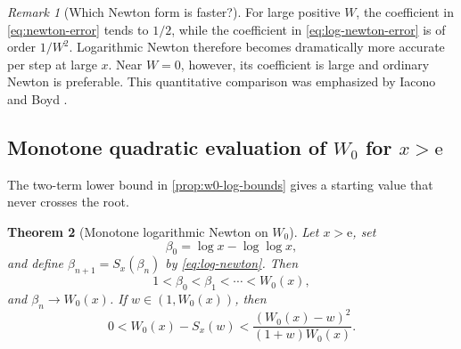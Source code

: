 \documentclass[11pt]{article}
\numberwithin{equation}{section}
\newtheorem{theorem}{Theorem}[section]
\theoremstyle{definition}
\theoremstyle{remark}
\newtheorem{remark}[theorem]{Remark}
\newcommand{\e}{\mathrm e}
\begin{document}
\begin{remark}[Which Newton form is faster?]
For large positive $W$, the coefficient in \eqref{eq:newton-error} tends to
$1/2$, while the coefficient in \eqref{eq:log-newton-error} is of order
$1/W^2$.  Logarithmic Newton therefore becomes dramatically more accurate per
step at large $x$.  Near $W=0$, however, its coefficient is large and ordinary
Newton is preferable.  This quantitative comparison was emphasized by Iacono
and Boyd \cite{IaconoBoyd2017}.
\end{remark}

\subsection{Monotone quadratic evaluation of \texorpdfstring{$W_0$ for $x>\e$}{W0 for x > e}}

The two-term lower bound in \cref{prop:w0-log-bounds} gives a starting value
that never crosses the root.

\begin{theorem}[Monotone logarithmic Newton on $W_0$]
\label{thm:w0-monotone-newton}
Let $x>\e$, set
\begin{equation}
 \beta_0=\log x-\log\log x,                            \label{eq:w0-beta0}
\end{equation}
and define $\beta_{n+1}=S_x(\beta_n)$ by
\eqref{eq:log-newton}.  Then
\begin{equation}
 1<\beta_0<\beta_1<\cdots<W_0(x),                     \label{eq:w0-monotone-chain}
\end{equation}
and $\beta_n\to W_0(x)$.  If $w\in(1,W_0(x))$, then
\begin{equation}
 0<W_0(x)-S_x(w)
 <\frac{(W_0(x)-w)^2}{(1+w)W_0(x)}.                   \label{eq:w0-log-newton-bound}
\end{equation}
\end{theorem}
\end{document}

